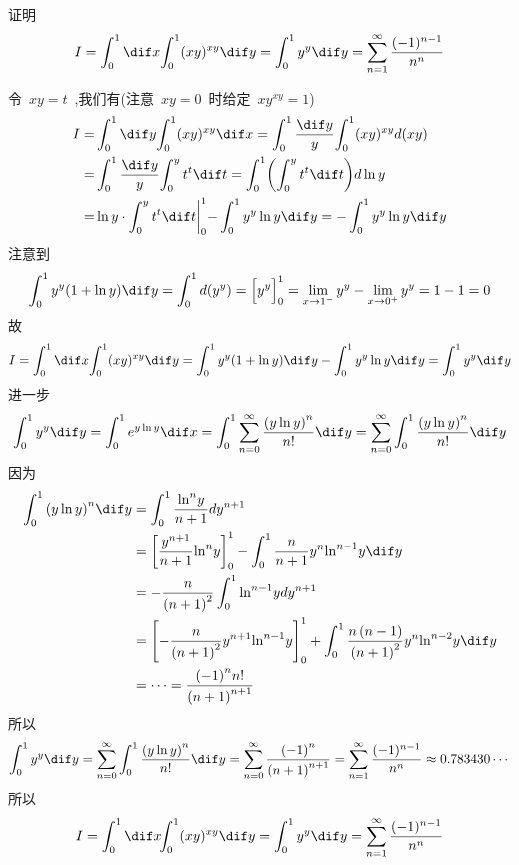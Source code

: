 \documentclass[color=green,titlestyle=hang]{elegantbook}%
\begin{document}
\begin{exercise} 证明 \begin{equation*}I=\int_{0}^{1}\dif x\!\int_{0}^{1}(xy)^{xy}\dif y=\int_{0}^{1}y^y\dif y=\sum_{n=1}^{\infty}\frac{(-1)^{n-1}}{n^n}\end{equation*}\end{exercise}
\begin{Solution} 
令~$xy=t$~,我们有(注意~$xy=0$~时给定~$\displaystyle{xy}^{xy}=1$)
\begin{align*}I=&\int_{0}^{1}\dif y\!\int_{0}^{1}(xy)^{xy}\dif x=\int_{0}^{1}\frac{\dif y}{y}\!\int_{0}^{1}(xy)^{xy}d(xy)\\
=&\int_{0}^{1}\frac{\dif y}{y}\!\int_{0}^{y}t^t\dif t=\int_{0}^{1}\biggl(\int_{0}^{y}t^t\dif t\biggl)d\ln y\\
=&\ln y\cdot\int_{0}^{y}t^t\dif t\biggl|_{0}^{1}-\int_{0}^{1}y^y\ln y\dif y=-\int_{0}^{1}y^y\ln y\dif y
\end{align*}
注意到\[\int_{0}^{1}y^y(1+\ln y)\dif y=\int_{0}^{1}d(y^y)=\Big[y^y\Big]_{0}^{1}=\lim_{x\to 1^-}y^y-\lim_{x\to 0^+}y^y=1-1=0\]
故\[I=\int_{0}^{1}\dif x\!\int_{0}^{1}(xy)^{xy}\dif y=\int_{0}^{1}y^y(1+\ln y)\dif y-\int_{0}^{1}y^y\ln y\dif y=\int_{0}^{1}y^y\dif y\]
进一步\[\int_0^1 {{y^y}} \dif y = \int_0^1 {{e^{y\ln y}}} \dif x = \int_0^1 {\sum\limits_{n = 0}^\infty  {\frac{{{{\left( {y\ln y} \right)}^n}}}{{n!}}} } \dif y = \sum\limits_{n = 0}^\infty  {\int_0^1 {\frac{{{{\left( {y\ln y} \right)}^n}}}{{n!}}\dif y} } \]
因为\begin{align*}
\int_0^1 {{\left( {y\ln y} \right)}^n}\dif y &= \int_0^1 {\frac{{{{\ln }^n}y}}{{n + 1}}d{y^{n + 1}}}\\
&= \left[ {\frac{{{y^{n + 1}}}}{{n + 1}}{{\ln }^n}y} \right]_0^1 - \int_0^1 \frac{n}{{n + 1}}{y^n}{{\ln }^{n - 1}}y\dif y \\
&=  - \frac{n}{{{{\left( {n + 1} \right)}^2}}}\int_0^1 {{{\ln }^{n - 1}}yd{y^{n + 1}}} \\
& = \left[ { - \frac{n}{{{{\left( {n + 1} \right)}^2}}}{y^{n + 1}}{{\ln }^{n - 1}}y} \right]_0^1 + \int_0^1 {\frac{{n\left( {n - 1} \right)}}{{{{\left( {n + 1} \right)}^2}}}} {y^n}{\ln ^{n - 2}}y\dif y \\
&=  \cdots  = \frac{{{{\left( { - 1} \right)}^n}n!}}{{{{\left( {n + 1} \right)}^{n + 1}}}}
\end{align*}
所以\[\int_0^1 {{y^y}} \dif y = \sum\limits_{n = 0}^\infty  {\int_0^1 {\frac{{{{\left( {y\ln y} \right)}^n}}}{{n!}}\dif y} }  = \sum\limits_{n = 0}^\infty  {\frac{{{{\left( { - 1} \right)}^n}}}{{{{\left( {n + 1} \right)}^{n + 1}}}}} =\sum_{n=1}^{\infty}\frac{(-1)^{n-1}}{n^n}\approx0.783430\cdots\]
所以\[ I=\int_{0}^{1}\dif x\!\!\int_{0}^{1}(xy)^{xy}\dif y=\int_{0}^{1}y^y\dif y=\sum_{n=1}^{\infty}\frac{(-1)^{n-1}}{n^n}\]	
\end{Solution}
\end{document}
